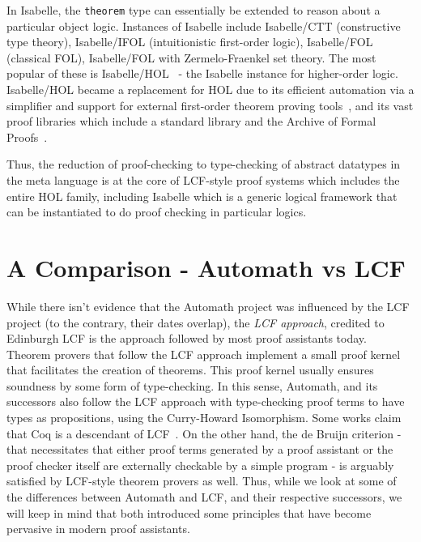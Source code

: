 \documentclass{article}
\begin{document}
	In Isabelle, the \texttt{theorem}
	type can essentially be extended to 
	reason about a particular object logic. 
	Instances of Isabelle include 
	Isabelle/CTT (constructive type theory),
	Isabelle/IFOL (intuitionistic first-order 
	logic), Isabelle/FOL (classical FOL), 
	Isabelle/FOL with Zermelo-Fraenkel 
	set theory. The most popular of these
	is Isabelle/HOL~\cite{10.5555/1791547} 
	- the Isabelle
	instance for higher-order logic.
	Isabelle/HOL became a replacement for 
	HOL due to its efficient automation 
	via a simplifier and support for 
	external first-order theorem proving 
	tools~\cite
	{10.1007/978-3-540-25984-8_28}, and 
	its vast proof libraries which include 
	a standard library and the 
	Archive of Formal Proofs~\cite{afp}. 
	
	Thus, the reduction of proof-checking
	to type-checking of abstract datatypes
	in the meta language is at the core 
	of LCF-style proof systems which 
	includes the entire HOL family, 
	including Isabelle which is a 
	generic logical framework that 
	can be instantiated to do proof
	checking in particular logics.
	

\section{A Comparison - Automath vs LCF}
  	While there isn't evidence that the 
  	Automath project was influenced by 
  	the LCF project (to the contrary, 
  	their dates overlap), the 
  	\textit{LCF approach}, credited 
  	to Edinburgh LCF is the approach
  	followed by most proof assistants 
  	today. Theorem provers that follow 
  	the LCF approach implement a small 
  	proof kernel that facilitates 
  	the creation of theorems. This 
  	proof kernel usually ensures 
  	soundness by some form of 
  	type-checking. In this sense, 
  	Automath, and its successors also 
  	follow the LCF approach with 
  	type-checking proof terms to have 
  	types as propositions, using the 
  	Curry-Howard Isomorphism. Some works 
  	claim that Coq is a descendant of 
  	LCF~\cite
  	{DBLP:journals/corr/abs-1907-02836}. 
  	On the other hand, the de Bruijn 
  	criterion - that necessitates 
  	that either proof terms generated 
  	by a proof assistant or the proof 
  	checker itself are externally 
  	checkable by a simple program - 
  	is arguably satisfied by LCF-style
  	theorem provers as well. Thus, 
  	while we look at some of the 
  	differences between Automath and 
  	LCF, and their respective successors, 
  	we will keep in mind that both 
  	introduced some principles that 
  	have become pervasive in modern 
  	proof assistants.
  	
\end{document}

